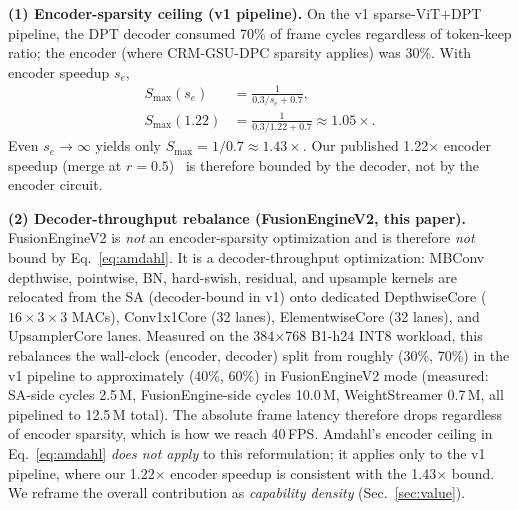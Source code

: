 \documentclass[journal]{IEEEtran}
\begin{document}
\textbf{(1) Encoder-sparsity ceiling (v1 pipeline).} On the v1 sparse-ViT$+$DPT pipeline, the DPT decoder consumed 70\% of frame cycles regardless of token-keep ratio; the encoder (where CRM-GSU-DPC sparsity applies) was 30\%. With encoder speedup $s_e$,
\begin{equation}
\label{eq:amdahl}
\begin{aligned}
S_{\max}(s_e) &= \frac{1}{0.3/s_e + 0.7}, \\
S_{\max}(1.22) &= \frac{1}{0.3/1.22 + 0.7} \approx 1.05\times.
\end{aligned}
\end{equation}
Even $s_e{\to}\infty$ yields only $S_{\max}{=}1/0.7{\approx}1.43\times$. Our published 1.22$\times$ encoder speedup (merge at $r{=}0.5$)~\cite{ours2024cal} is therefore bounded by the decoder, not by the encoder circuit.

\textbf{(2) Decoder-throughput rebalance (FusionEngineV2, this paper).} FusionEngineV2 is \emph{not} an encoder-sparsity optimization and is therefore \emph{not} bound by Eq.~\ref{eq:amdahl}. It is a decoder-throughput optimization: MBConv depthwise, pointwise, BN, hard-swish, residual, and upsample kernels are relocated from the SA (decoder-bound in v1) onto dedicated DepthwiseCore ($16{\times}3{\times}3$ MACs), Conv1x1Core (32 lanes), ElementwiseCore (32 lanes), and UpsamplerCore lanes. Measured on the 384$\times$768 B1-h24 INT8 workload, this rebalances the wall-clock (encoder, decoder) split from roughly (30\%, 70\%) in the v1 pipeline to approximately (40\%, 60\%) in FusionEngineV2 mode (measured: SA-side cycles 2.5\,M, FusionEngine-side cycles 10.0\,M, WeightStreamer 0.7\,M, all pipelined to 12.5\,M total). The absolute frame latency therefore drops regardless of encoder sparsity, which is how we reach 40\,FPS. Amdahl's encoder ceiling in Eq.~\ref{eq:amdahl} \emph{does not apply} to this reformulation; it applies only to the v1 pipeline, where our 1.22$\times$ encoder speedup is consistent with the 1.43$\times$ bound. We reframe the overall contribution as \emph{capability density} (Sec.~\ref{sec:value}).
\end{document}
